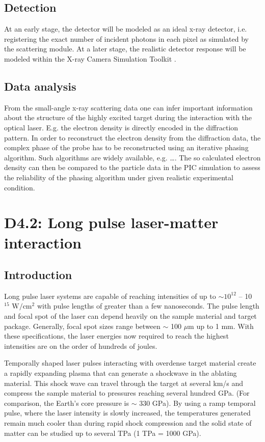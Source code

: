 \documentclass[a4paper]{article}
\begin{document}
\subsection{Detection}
At an early stage, the detector will be modeled as an ideal x-ray detector, i.e. registering the exact number of incident photons in each
pixel as simulated by the scattering module. At a later stage, the realistic detector response will be modeled within the
X-ray Camera Simulation Toolkit \cite{Joy2015}.%
%
\subsection{Data analysis}
From the small-angle x-ray scattering data one can infer important information about the structure of the highly excited target during
the interaction with the optical laser. E.g. the electron density is directly encoded in the diffraction pattern. In order to
reconstruct the electron density from the diffraction data, the complex phase of the probe has to be reconstructed using an iterative phasing
algorithm. Such algorithms are widely available, e.g. \ldots {}.
The so calculated electron density can then be compared to the particle data in the PIC simulation to assess the reliability of
the phasing algorithm under given realistic experimental condition. 

\section{D4.2: Long pulse laser-matter interaction\label{sec:long_pulse}} %
\subsection{Introduction}
Long pulse laser systems are capable of reaching intensities of up to $\sim 10^{12}$ -- 10$^{15} \text{ W}/\text{cm}^2$ with pulse lengths of greater than a few nanoseconds. The pulse length and focal spot of the laser can depend heavily on the sample material and target package. Generally, focal spot sizes range between $\sim$ 100 $\mu$m up to 1 mm. With these specifications, the laser energies now required to reach the highest intensities are on the order of hundreds of joules.

Temporally shaped laser pulses interacting with overdense target material create a rapidly expanding plasma that
can generate a shockwave in the ablating material. This shock wave can travel through the target at several km/s
and compress the sample material to pressures reaching several hundred GPa. (For comparison, the Earth's core
pressure is $\sim$ 330 GPa). By using a ramp temporal pulse, where the laser intensity is slowly increased, the temperatures generated remain much cooler than during rapid shock compression and the solid state of matter can be studied up to several TPa (1 TPa = 1000 GPa).
\end{document}
